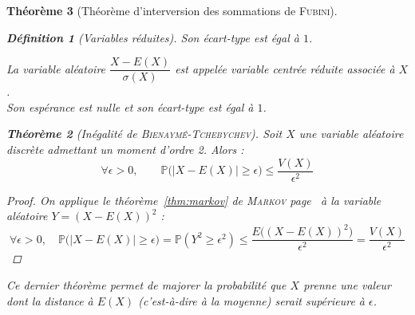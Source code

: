 \documentclass[11pt,a4paper]{report}
\newtheorem{theorem}{Théorème}[chapter]
\newtheorem{itheorem}[theorem]{Théorème}
\theoremstyle{definition}
\newtheorem{dfn}[theorem]{Définition}
\begin{document}
\begin{theorem}[Théorème d'interversion des sommations de \textsc{Fubini}]
{{\begin{dfn}[Variables réduites]
     Son écart-type est égal à $1$.\par
     La variable aléatoire $\dfrac{X - E(X)}{\sigma (X)}$ est appelée \emph{variable centrée réduite} associée à $X$.\\
     Son espérance est nulle et son écart-type est égal à $1$.
\end{dfn}
\begin{itheorem}[Inégalité de \textsc{Bienaymé}-\textsc{Tchebychev}]
     Soit $X$ une variable aléatoire discrète \emph{admettant un moment d'ordre 2}. Alors : 
     \begin{equation}
     \forall \epsilon > 0,\qquad \mathbb{P}\Big( \big| X - E(X) \big| \ge \epsilon \Big) \le \dfrac{V(X)}{\epsilon^2}
     \end{equation}
\end{itheorem}
\begin{proof}
     On applique le théorème~\ref{thm:markov} de \textsc{Markov} page~\pageref{thm:markov} à la variable aléatoire $Y= (X - E(X))^2$ : 
     \begin{equation*}
          \forall \epsilon> 0, \quad \mathbb{P}\Big( \big| X - E(X) \big| \ge \epsilon \Big)=\mathbb{P}(Y^2 \ge \epsilon^2)\le \dfrac{E\big( (X-E(X))^2\big)}{\epsilon^2} = \dfrac{V(X)}{\epsilon^2}
     \end{equation*}
\end{proof}
Ce dernier théorème permet de majorer la probabilité que $X$ prenne une valeur dont la distance à $E(X)$ (c'est-à-dire à la moyenne) serait supérieure à $\epsilon$.

}}
\end{theorem}
\end{document}
